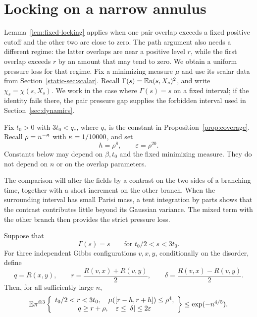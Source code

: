 \section{Locking on a narrow annulus}\label{sec:narrow}

Lemma~\ref{lem:fixed-locking} applies when one pair overlap exceeds a
fixed positive cutoff and the other two are close to zero. The path
argument also needs a different regime: the latter overlaps are near a
positive level $r$, while the first overlap exceeds $r$ by an amount
that may tend to zero. We obtain a uniform pressure loss for that regime.
Fix a minimizing measure $\mu$ and use its scalar data from
Section~\ref{static-sec:scalar}. Recall
$\Gamma(s)=\mathbb E u(s,X_s)^2$, and write
$\chi_s=\chi(s,X_s)$. We work in the case where
$\Gamma(s)=s$ on a fixed interval; if the identity fails there, the pair
pressure gap supplies the forbidden interval used in
Section~\ref{sec:dynamics}.

Fix $t_0>0$ with $3t_0<q_*$, where $q_*$ is the constant in
Proposition~\ref{prop:coverage}. Recall $\rho=n^{-\kappa}$ with
$\kappa=1/10000$, and set
\begin{equation}\label{eq:narrow-scales}
 h=\rho^8,\qquad \varepsilon=\rho^{20}.
\end{equation}
Constants below may depend on $\beta,t_0$ and the fixed minimizing
measure. They do not depend on $n$ or on the overlap parameters.

The comparison will alter the fields by a contrast on the two sides
of a branching time, together with a short increment on the other
branch. When the surrounding interval has small Parisi mass, a tent
integration by parts shows that the contrast contributes little beyond
its Gaussian variance. The mixed term with the other branch then
provides the strict pressure loss.

\begin{lemma}\label{lem:narrow-locking}
Suppose that
\begin{equation}\label{eq:narrow-identity}
 \Gamma(s)=s\qquad\text{for }t_0/2<s<3t_0.
\end{equation}
For three independent Gibbs configurations $v,x,y$, conditionally on
the disorder, define
\[
 q=R(x,y),\qquad
 r=\frac{R(v,x)+R(v,y)}2,\qquad
 \delta=\frac{R(v,x)-R(v,y)}2.
\]
Then, for all sufficiently large $n$,
\begin{equation}\label{eq:narrow-locking-probability}
 \mathbb E\pi^{\otimes3}\left\{
 \begin{array}{c}
 t_0/2<r<3t_0,\quad \mu([r-h,r+h])\le\rho^4,\\
 q\ge r+\rho,\quad \varepsilon\le|\delta|\le2\varepsilon
 \end{array}\right\}
 \le \exp(-n^{4/5}).
\end{equation}
\end{lemma}

